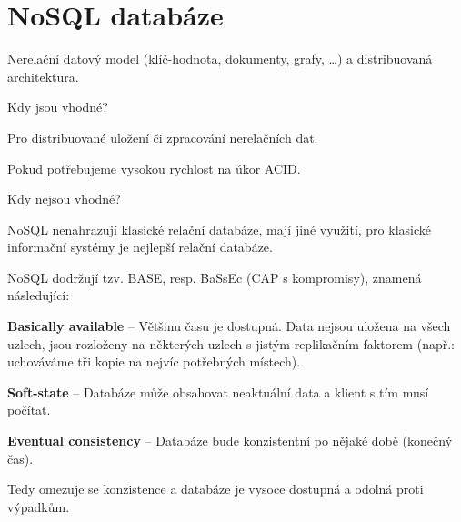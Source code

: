
\section{NoSQL databáze}

\begin{compactitem}
    \item Nerelační datový model (klíč-hodnota, dokumenty, grafy, \dots) a distribuovaná architektura.

    \item Kdy jsou vhodné? \begin{compactitem}
        \item Pro distribuované uložení či zpracování nerelačních dat.
        \item Pokud potřebujeme vysokou rychlost na úkor ACID.
    \end{compactitem}

    \item Kdy nejsou vhodné? \begin{compactitem}
        \item NoSQL nenahrazují klasické relační databáze, mají jiné využití, pro klasické informační systémy je nejlepší relační databáze.
    \end{compactitem}

    \item NoSQL dodržují tzv. BASE, resp. BaSsEc (CAP s kompromisy), znamená následující: \begin{compactitem}
        \item \textbf{Basically available} -- Většinu času je dostupná. Data nejsou uložena na všech uzlech, jsou rozloženy na některých uzlech s jistým replikačním faktorem (např.: uchováváme tři kopie na nejvíc potřebných místech).

        \item \textbf{Soft-state} -- Databáze může obsahovat neaktuální data a klient s tím musí počítat.

        \item \textbf{Eventual consistency} -- Databáze bude konzistentní po nějaké době (konečný čas).
    \end{compactitem}

    \item Tedy omezuje se konzistence a databáze je vysoce dostupná a odolná proti výpadkům.


\end{compactitem}
